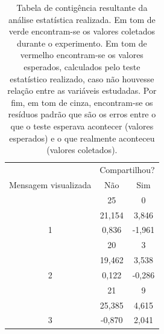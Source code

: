 \begin{table}[h]
\centering
\label{tab:tab2}
\begin{tabular}{|c|l|c|c|}
\hline
\multicolumn{2}{|c|}{}                                       & \multicolumn{2}{c|}{Compartilhou?}                              \\ \cline{3-4} 
\multicolumn{2}{|c|}{\multirow{-2}{*}{Mensagem visualizada}} & Não                            & Sim                            \\ \hline
\multicolumn{2}{|c|}{}                                       & \cellcolor[HTML]{67FD9A}25     & \cellcolor[HTML]{67FD9A}0      \\
\multicolumn{2}{|c|}{}                                       & \cellcolor[HTML]{FD6864}21,154 & \cellcolor[HTML]{FD6864}3,846  \\
\multicolumn{2}{|c|}{\multirow{-3}{*}{1}}                    & \cellcolor[HTML]{C0C0C0}0,836  & \cellcolor[HTML]{C0C0C0}-1,961 \\ \hline
\multicolumn{2}{|c|}{}                                       & \cellcolor[HTML]{67FD9A}20     & \cellcolor[HTML]{67FD9A}3      \\
\multicolumn{2}{|c|}{}                                       & \cellcolor[HTML]{FD6864}19,462 & \cellcolor[HTML]{FD6864}3,538  \\
\multicolumn{2}{|c|}{\multirow{-3}{*}{2}}                    & \cellcolor[HTML]{C0C0C0}0,122  & \cellcolor[HTML]{C0C0C0}-0,286 \\ \hline
\multicolumn{2}{|c|}{}                                       & \cellcolor[HTML]{67FD9A}21     & \cellcolor[HTML]{67FD9A}9      \\
\multicolumn{2}{|c|}{}                                       & \cellcolor[HTML]{FD6864}25,385 & \cellcolor[HTML]{FD6864}4,615  \\
\multicolumn{2}{|c|}{\multirow{-3}{*}{3}}                    & \cellcolor[HTML]{C0C0C0}-0,870 & \cellcolor[HTML]{C0C0C0}2,041  \\ \hline
\end{tabular}
\caption{Tabela de contigência resultante da análise estatística realizada. Em tom de verde encontram-se os valores coletados durante o experimento. Em tom de vermelho encontram-se os valores esperados, calculados pelo teste estatístico realizado, caso não houvesse relação entre as variáveis estudadas. Por fim, em tom de cinza, encontram-se os resíduos padrão que são os erros entre o que o teste esperava acontecer (valores esperados) e o que realmente aconteceu (valores coletados).}
\end{table}

